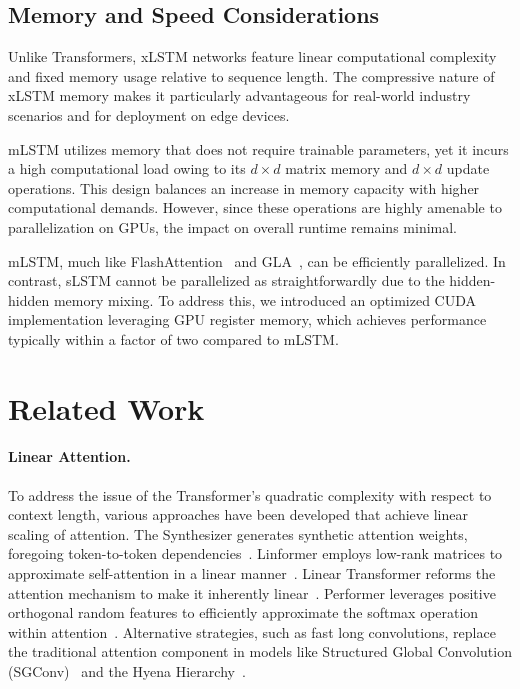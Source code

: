 \subsection{Memory and Speed Considerations}

Unlike Transformers, xLSTM networks feature linear computational complexity and fixed memory usage relative to sequence length. The compressive nature of xLSTM memory makes it particularly advantageous for real-world industry scenarios and for deployment on edge devices.

mLSTM utilizes memory that does not require trainable parameters, yet it incurs a high computational load owing to its $d \times d$ matrix memory and $d \times d$ update operations. This design balances an increase in memory capacity with higher computational demands. However, since these operations are highly amenable to parallelization on GPUs, the impact on overall runtime remains minimal.

mLSTM, much like FlashAttention~\citep{Dao:22,Dao:23} and GLA~\citep{Yang:23arxiv}, can be efficiently parallelized. In contrast, sLSTM cannot be parallelized as straightforwardly due to the hidden-hidden memory mixing. To address this, we introduced an optimized CUDA implementation leveraging GPU register memory, which achieves performance typically within a factor of two compared to mLSTM.

\section{Related Work}
\label{sec:related}

\paragraph{Linear Attention.} To address the issue of the Transformer's quadratic complexity with respect to context length, various approaches have been developed that achieve linear scaling of attention. The Synthesizer generates synthetic attention weights, foregoing token-to-token dependencies~\citep{Tay:20arxiv}. Linformer employs low-rank matrices to approximate self-attention in a linear manner~\citep{Wang:20arxiv}. Linear Transformer reforms the attention mechanism to make it inherently linear~\citep{Katharopoulos:20}. Performer leverages positive orthogonal random features to efficiently approximate the softmax operation within attention~\citep{Choromanski:21}. Alternative strategies, such as fast long convolutions, replace the traditional attention component in models like Structured Global Convolution (SGConv)~\citep{Li:22} and the Hyena Hierarchy~\citep{Poli:23}.

